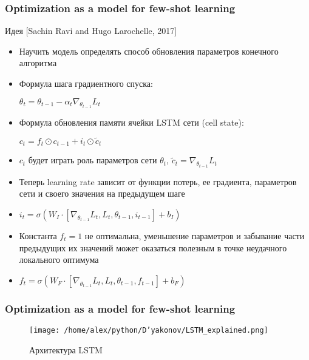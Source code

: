 \documentclass[fleqn, xcolor=x11names]{beamer}
\begin{document}
\begin{frame}\frametitle{Optimization as a model for few-shot learning}

\begin{block}{Идея [Sachin Ravi and Hugo Larochelle, 2017]}
{\footnotesize 
\begin{itemize}
\item Научить модель определять способ обновления параметров конечного алгоритма
\item Формула шага градиентного спуска:
\begin{center}
 $ \theta_t = \theta_{t-1} - \alpha_t \nabla_{\theta_{t-1}}L_t$
\end{center}
\item Формула обновления памяти ячейки LSTM сети (cell state):
\begin{center}
 $ c_t = f_t \odot c_{t-1} + i_t \odot \tilde{c}_t$
\end{center}

\item $c_t$ будет играть роль параметров сети $\theta_t$, $\tilde{c}_t = \nabla_{\theta_{t-1}}L_t$

\item Теперь learning rate зависит от функции потерь, ее градиента, параметров сети и своего значения на предыдущем шаге

\item $i_t = \sigma(W_I \cdot \left[ \nabla_{\theta_{t-1}}L_t, L_t, \theta_{t-1}, i_{t-1} \right] + b_I)$

\item Константа $f_t = 1$ не оптимальна, уменьшение параметров и забывание части предыдущих их значений может оказаться полезным в точке неудачного локального оптимума

\item $f_t = \sigma(W_F \cdot \left[ \nabla_{\theta_{t-1}}L_t, L_t, \theta_{t-1}, f_{t-1} \right] + b_F)$

\end{itemize}

}
\end{block}

\end{frame}

\begin{frame}\frametitle{Optimization as a model for few-shot learning}
\begin{figure}[h]
\begin{center}
\texttt{[image: /home/alex/python/D'yakonov/LSTM\_explained.png]}
\caption{{\footnotesize Архитектура LSTM }}
\end{center}
\end{figure}
\end{frame}
\end{document}
